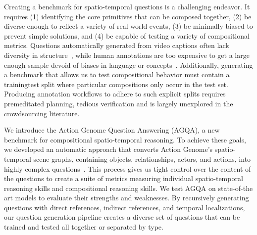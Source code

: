 Creating a benchmark for spatio-temporal questions is a challenging endeavor. It requires (1) identifying the core primitives that can be composed together, (2) be diverse enough to reflect a variety of real world events, (3) be minimally biased to prevent simple solutions, and (4) be capable of testing a variety of compositional metrics. 
Questions automatically generated from video captions often lack diversity in structure~\cite{yu2019activitynet,jang2017tgif}, while human annotations are too expensive to get a large enough sample devoid of biases in language or concepts~\cite{zeng2016leveraging,yu2019activitynet}. Additionally, generating a benchmark that allows us to test compositional behavior must contain a training\/test split where particular compositions only occur in the test set. Producing annotation workflows to adhere to such explicit splits requires premeditated planning, tedious verification and is largely unexplored in the crowdsourcing literature.

We introduce the Action Genome Question Answering (AGQA), a new benchmark for compositional spatio-temporal reasoning. 
To achieve these goals, we developed an automatic approach that converts Action Genome’s spatio-temporal scene graphs, containing objects, relationships, actors, and actions, into highly complex questions~\cite{ji2020action}. This process gives us tight control over the content of the questions to create a suite of metrics measuring individual spatio-temporal reasoning skills and compositional reasoning skills. We test AGQA on state-of-the art models to evaluate their strengths and weaknesses. 
By recursively generating questions with direct references, indirect references, and temporal localizations, our question generation pipeline creates a diverse set of questions that can be trained and tested all together or separated by type.


